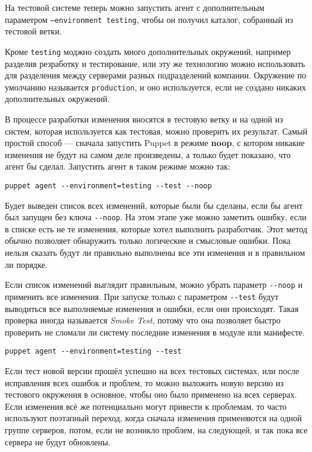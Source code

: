 На тестовой системе теперь можно запустить агент с дополнительным параметром \texttt{--environment testing}, чтобы он получил каталог, собранный из тестовой ветки.

Кроме \texttt{testing} моджно создать много дополнительных окружений, например разделив резработку и тестирование, или эту же технологию можно использовать для разделения между серверами разных подразделений компании. Окружение по умолчанию называется \texttt{production}, и оно используется, если не создано никаких дополнительных окружений.

В процессе разработки изменения вносятся в тестовую ветку и на одной из систем, которая используется как тестовая, можно проверить их результат. Самый простой способ --- сначала запустить Puppet в режиме \textbf{noop}, с котором никакие изменения не будут на самом деле произведены, а только будет показано, что агент бы сделал. Запустить агент в таком режиме можно так:

\begin{verbatim}
puppet agent --environment=testing --test --noop
\end{verbatim}

Будет выведен список всех изменений, которые были бы сделаны, если бы агент был запущен без ключа \texttt{-{}-noop}. На этом этапе уже можно заметить ошибку, если в списке есть не те изменения, которые хотел выполнить разработчик. Этот метод обычно позволяет обнаружить только логические и смысловые ошибки. Пока нельзя сказать будут ли правильно выполнены все эти изменения и в правильном ли порядке.

Если список изменений выглядит правильным, можно убрать параметр \texttt{-{}-noop} и применить все изменения. При запуске только с параметром \texttt{-{}-test} будут выводиться все выполняемые изменения и ошибки, если они происходят. Такая проверка иногда называется \textit{Smoke Test}, потому что она позволяет быстро проверить не сломали ли систему последние изменения в модуле или манифесте.

\begin{verbatim}
puppet agent --environment=testing --test
\end{verbatim}

Если тест новой версии прошёл успешно на всех тестовых системах, или после исправления всех ошибок и проблем, то можно выложить новую версию из тестового окружения в основное, чтобы оно было применено на всех серверах. Если изменения всё же потенциально могут привести к проблемам, то часто используют поэтапный переход, когда сначала изменения применяются на одной группе серверов, потом, если не возникло проблем, на следующей, и так пока все сервера не будут обновлены.

